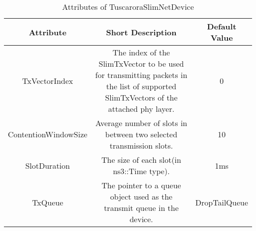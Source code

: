 %
%
%
\begin{longtable}{ | c | c | c |}

\caption{Attributes of TuscaroraSlimNetDevice}\label{table:SlimNetDeviceTableofAttributes}	\\
 
     \hline
  \textbf{Attribute} & \textbf{Short Description} & \textbf{Default Value} \\ \hline
 

 TxVectorIndex &  \parbox[][][t]{6.5cm}{\vspace{6pt}\raggedright The index of the SlimTxVector to be used for transmitting packets in the list of supported SlimTxVectors of the attached phy layer.\vspace{6pt}} &  0 \\ \hline 

 ContentionWindowSize &  \parbox[][][t]{6.5cm}{\vspace{6pt}\raggedright Average number of slots in between two selected transmission slots.\vspace{6pt}}  & 10 \\ \hline 

 SlotDuration &  \parbox[][][t]{6.5cm}{\vspace{6pt}\raggedright The size of each slot(in ns3::Time type).\vspace{6pt}} & 1ms \\ \hline 
 
				   
 TxQueue &  \parbox[][][t]{6.5cm}{\vspace{6pt}\raggedright The pointer to a queue object used as the transmit queue in the device.\vspace{6pt}}  & DropTailQueue \\ \hline 
			   			   
				   
	   
 \end{longtable}   
